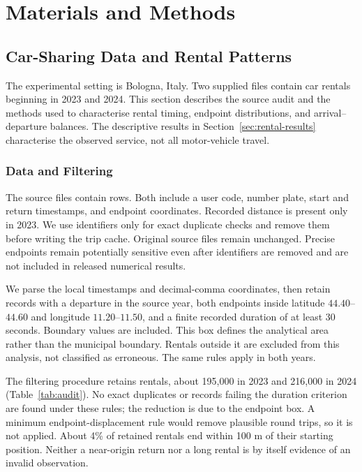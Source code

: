 \documentclass{interact}
\begin{document}
\section{Materials and Methods}
\subsection{Car-Sharing Data and Rental Patterns}
\label{sec:sharing}
The experimental setting is Bologna, Italy. Two supplied files contain car rentals beginning in 2023 and 2024. This section describes the source audit and the methods used to characterise rental timing, endpoint distributions, and arrival--departure balances. The descriptive results in Section~\ref{sec:rental-results} characterise the observed service, not all motor-vehicle travel.

\subsubsection{Data and Filtering}
The source files contain \RawCars{} rows. Both include a user code, number plate, start and return timestamps, and endpoint coordinates. Recorded distance is present only in 2023. We use identifiers only for exact duplicate checks and remove them before writing the trip cache. Original source files remain unchanged. Precise endpoints remain potentially sensitive even after identifiers are removed and are not included in released numerical results.

We parse the local timestamps and decimal-comma coordinates, then retain records with a departure in the source year, both endpoints inside latitude $44.40$--$44.60$ and longitude $11.20$--$11.50$, and a finite recorded duration of at least 30 seconds. Boundary values are included. This box defines the analytical area rather than the municipal boundary. Rentals outside it are excluded from this analysis, not classified as erroneous. The same rules apply in both years.

\begin{table}[t]
\caption{Car-rental filtering. Rules are applied in order; each excluded row is counted once. Outside-area rentals are not necessarily invalid.}
\label{tab:audit}\centering\footnotesize

\end{table}

The filtering procedure retains \RetainedCars{} rentals, about 195,000 in 2023 and 216,000 in 2024 (Table~\ref{tab:audit}). No exact duplicates or records failing the duration criterion are found under these rules; the reduction is due to the endpoint box. A minimum endpoint-displacement rule would remove plausible round trips, so it is not applied. About 4\%{} of retained rentals end within 100 m of their starting position. Neither a near-origin return nor a long rental is by itself evidence of an invalid observation.
\end{document}
